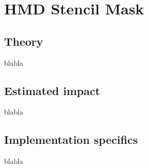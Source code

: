 
\section{HMD Stencil Mask}
\subsection{Theory}
blabla
\subsection{Estimated impact}
blabla
\subsection{Implementation specifics}
blabla
